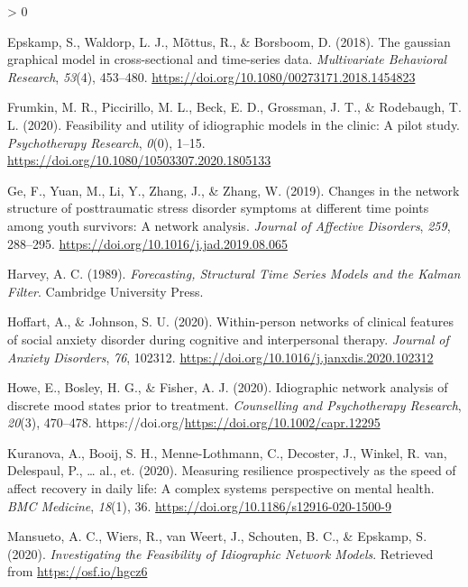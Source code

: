 \documentclass[
  english,
  man]{apa6}
\newlength{\cslhangindent}
\newenvironment{CSLReferences}[2] %
 {%
  \setlength{\parindent}{0pt}
  \ifodd #1 \everypar{\setlength{\hangindent}{\cslhangindent}}\ignorespaces\fi
  \ifnum #2 > 0
  \setlength{\parskip}{#2\baselineskip}
  \fi
 }%
 {}
\begin{document}
\begin{CSLReferences}{1}{0}
\leavevmode\hypertarget{ref-EpskampEtAl2018b}{}%
Epskamp, S., Waldorp, L. J., Mõttus, R., \& Borsboom, D. (2018). The gaussian graphical model in cross-sectional and time-series data. \emph{Multivariate Behavioral Research}, \emph{53}(4), 453--480. \url{https://doi.org/10.1080/00273171.2018.1454823}

\leavevmode\hypertarget{ref-FrumkinEtAl2020}{}%
Frumkin, M. R., Piccirillo, M. L., Beck, E. D., Grossman, J. T., \& Rodebaugh, T. L. (2020). Feasibility and utility of idiographic models in the clinic: A pilot study. \emph{Psychotherapy Research}, \emph{0}(0), 1--15. \url{https://doi.org/10.1080/10503307.2020.1805133}

\leavevmode\hypertarget{ref-GeEtAl2019}{}%
Ge, F., Yuan, M., Li, Y., Zhang, J., \& Zhang, W. (2019). Changes in the network structure of posttraumatic stress disorder symptoms at different time points among youth survivors: A network analysis. \emph{Journal of Affective Disorders}, \emph{259}, 288--295. \url{https://doi.org/10.1016/j.jad.2019.08.065}

\leavevmode\hypertarget{ref-Harvey1989}{}%
Harvey, A. C. (1989). \emph{Forecasting, Structural Time Series Models and the Kalman Filter}. Cambridge University Press.

\leavevmode\hypertarget{ref-HoffartJohnson2020}{}%
Hoffart, A., \& Johnson, S. U. (2020). Within-person networks of clinical features of social anxiety disorder during cognitive and interpersonal therapy. \emph{Journal of Anxiety Disorders}, \emph{76}, 102312. \url{https://doi.org/10.1016/j.janxdis.2020.102312}

\leavevmode\hypertarget{ref-HoweEtAl2020}{}%
Howe, E., Bosley, H. G., \& Fisher, A. J. (2020). Idiographic network analysis of discrete mood states prior to treatment. \emph{Counselling and Psychotherapy Research}, \emph{20}(3), 470--478. https://doi.org/\url{https://doi.org/10.1002/capr.12295}

\leavevmode\hypertarget{ref-KuranovaEtAl2020}{}%
Kuranova, A., Booij, S. H., Menne-Lothmann, C., Decoster, J., Winkel, R. van, Delespaul, P., \ldots{} al., et. (2020). Measuring resilience prospectively as the speed of affect recovery in daily life: A complex systems perspective on mental health. \emph{BMC Medicine}, \emph{18}(1), 36. \url{https://doi.org/10.1186/s12916-020-1500-9}

\leavevmode\hypertarget{ref-MansuetoEtAl2020}{}%
Mansueto, A. C., Wiers, R., van Weert, J., Schouten, B. C., \& Epskamp, S. (2020). \emph{Investigating the Feasibility of Idiographic Network Models}. Retrieved from \url{https://osf.io/hgcz6}


\end{CSLReferences}
\end{document}
